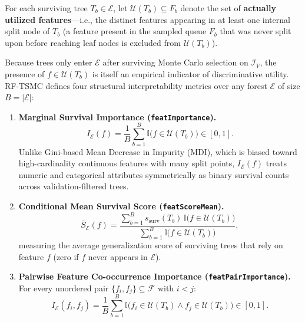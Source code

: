 \documentclass[11pt,a4paper]{article}
\newcommand{\code}[1]{\texttt{#1}}
\newcommand{\Ind}{\mathbb{I}}
\begin{document}
For each surviving tree $T_b \in \mathcal{E}$, let $\mathcal{U}(T_b) \subseteq F_b$ denote the set of \textbf{actually utilized features}---i.e., the distinct features appearing in at least one internal split node of $T_b$ (a feature present in the sampled queue $F_b$ that was never split upon before reaching leaf nodes is excluded from $\mathcal{U}(T_b)$).

Because trees only enter $\mathcal{E}$ after surviving Monte Carlo selection on $\mathcal{I}_V$, the presence of $f \in \mathcal{U}(T_b)$ is itself an empirical indicator of discriminative utility. RF-TSMC defines four structural interpretability metrics over any forest $\mathcal{E}$ of size $B = |\mathcal{E}|$:

\begin{enumerate}[leftmargin=*, itemsep=4pt]
  \item \textbf{Marginal Survival Importance (\code{featImportance}).}
  \begin{equation}
    I_{\mathcal{E}}(f) = \frac{1}{B} \sum_{b=1}^{B} \Ind\!\big(f \in \mathcal{U}(T_b)\big) \in [0, 1].
  \end{equation}
  Unlike Gini-based Mean Decrease in Impurity (MDI), which is biased toward high-cardinality continuous features with many split points, $I_{\mathcal{E}}(f)$ treats numeric and categorical attributes symmetrically as binary survival counts across validation-filtered trees.

  \item \textbf{Conditional Mean Survival Score (\code{featScoreMean}).}
  \begin{equation}
    \bar{S}_{\mathcal{E}}(f) = \frac{\sum_{b=1}^{B} s_{\text{surv}}(T_b)\,\Ind\!\big(f \in \mathcal{U}(T_b)\big)}{\sum_{b=1}^{B} \Ind\!\big(f \in \mathcal{U}(T_b)\big)},
  \end{equation}
  measuring the average generalization score of surviving trees that rely on feature $f$ (zero if $f$ never appears in $\mathcal{E}$).

  \item \textbf{Pairwise Feature Co-occurrence Importance (\code{featPairImportance}).} For every unordered pair $\{f_i, f_j\} \subseteq \mathcal{F}$ with $i < j$:
  \begin{equation}
    I_{\mathcal{E}}(f_i, f_j) = \frac{1}{B} \sum_{b=1}^{B} \Ind\!\big(f_i \in \mathcal{U}(T_b) \land f_j \in \mathcal{U}(T_b)\big) \in [0, 1].
  \end{equation}


\end{enumerate}
\end{document}
